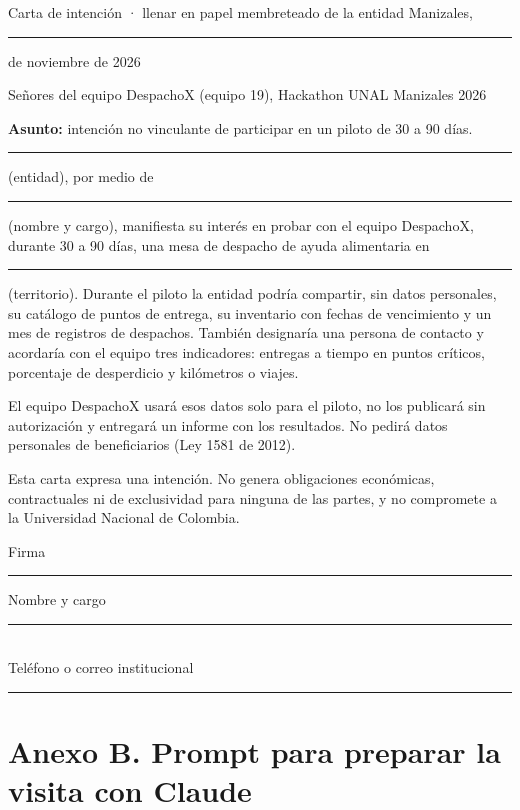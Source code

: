 \documentclass[11pt,letterpaper,parskip=half-]{scrartcl}
\begin{document}
\begin{plantilla}{Carta de intención · llenar en papel membreteado de la entidad}
Manizales, \rule{1.2cm}{0.4pt} de noviembre de 2026

Señores del equipo DespachoX (equipo 19), Hackathon UNAL Manizales 2026

\textbf{Asunto:} intención no vinculante de participar en un piloto de 30 a 90 días.

\rule{5.5cm}{0.4pt} (entidad), por medio de \rule{4.5cm}{0.4pt} (nombre y cargo), manifiesta su interés en probar con el equipo DespachoX, durante 30 a 90 días, una mesa de despacho de ayuda alimentaria en \rule{3.5cm}{0.4pt} (territorio). Durante el piloto la entidad podría compartir, sin datos personales, su catálogo de puntos de entrega, su inventario con fechas de vencimiento y un mes de registros de despachos. También designaría una persona de contacto y acordaría con el equipo tres indicadores: entregas a tiempo en puntos críticos, porcentaje de desperdicio y kilómetros o viajes.

El equipo DespachoX usará esos datos solo para el piloto, no los publicará sin autorización y entregará un informe con los resultados. No pedirá datos personales de beneficiarios (Ley 1581 de 2012).

Esta carta expresa una intención. No genera obligaciones económicas, contractuales ni de exclusividad para ninguna de las partes, y no compromete a la Universidad Nacional de Colombia.

Firma \rule{4.5cm}{0.4pt} \qquad Nombre y cargo \rule{5.5cm}{0.4pt}\\ Teléfono o correo institucional \rule{5cm}{0.4pt}
\end{plantilla}

\section*{Anexo B. Prompt para preparar la visita con Claude}
\end{document}
